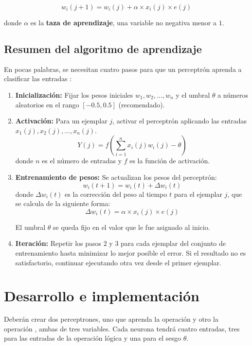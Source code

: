\[w_i(j+1) = w_i(j) + \alpha \times x_i(j) \times e(j) \]
\parencite[171]{Nengnevitsky2005}

\noindent donde $\alpha$ es la \textbf{taza de aprendizaje}, una variable no negativa menor a $1$.

\subsection{Resumen del algoritmo de aprendizaje}

\noindent En pocas palabras, se necesitan cuatro pasos para que un perceptrón aprenda a clasificar las entradas \parencite[172]{Nengnevitsky2005}:\par

\begin{enumerate}
  \item \textbf{Inicialización:} Fijar los pesos iniciales \(w_1, w_2, ..., w_n\) y el umbral $\theta$ a números aleatorios en el rango $[-0.5, 0.5]$ (recomendado).
  
  \item \textbf{Activación:} Para un ejemplar $j$, activar el perceptrón aplicando las entradas\\ \(x_1(j), x_2(j), ..., x_n(j)\).
  \[Y(j) = f\left(\sum_{i=1}^{n}x_i(j)w_i(j)-\theta\right)\]
  donde $n$ es el número de entradas y $f$ es la función de activación.
  
  \item \textbf{Entrenamiento de pesos:} Se actualizan los pesos del perceptrón:
  \[w_i(t+1)=w_i(t)+\Delta w_i(t)\]
  donde \(\Delta w_i(t)\) es la corrección del peso al tiempo $t$ para el ejemplar $j$, que se calcula de la siguiente forma:
  \[\Delta w_i(t)=\alpha \times x_i(j) \times e(j)\]
  
  El umbral $\theta$ se queda fijo en el valor que le fue asignado al inicio.
  
  \item \textbf{Iteración:} Repetir los pasos 2 y 3 para cada ejemplar del conjunto de entrenamiento hasta minimizar lo mejor posible el error. Si el resultado no es satisfactorio, continuar ejecutando otra vez desde el primer ejemplar.
  \label{algo:b}
\end{enumerate}

\section{Desarrollo e implementaci\'on}

\noindent Deberán crear dos perceptrones, uno que aprenda la operación  y otro la operación , ambas de tres variables. Cada neurona tendrá cuatro entradas, tres para las entradas de la operación lógica y una para el sesgo $\theta$.\par

